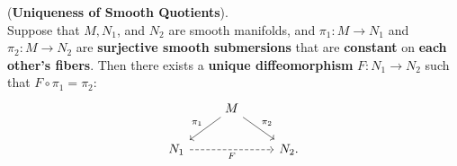 \documentclass[11pt]{article}
\begin{document}
\begin{itemize}
\begin{theorem} (\textbf{Uniqueness of Smooth Quotients}). \\
Suppose that $M, N_1$, and $N_2$ are smooth manifolds, and $\pi_1: M \rightarrow N_1$ and $\pi_2: M \rightarrow N_2$ are \textbf{surjective smooth submersions} that are \textbf{constant} on \textbf{each other's fibers}. Then there exists a \textbf{unique diffeomorphism} $F: N_1 \rightarrow N_2$ such that $F\circ \pi_1 = \pi_2$:
\[
  \begin{tikzcd}
     & M  \arrow[swap]{dl}{\pi_1} \arrow[dr, "\pi_2"]  & \\
     N_1   \arrow[rr, swap, dashed,  "F"]  & & N_2.
  \end{tikzcd}
\] 
\end{theorem}

\end{itemize}



\newpage


\end{document}
